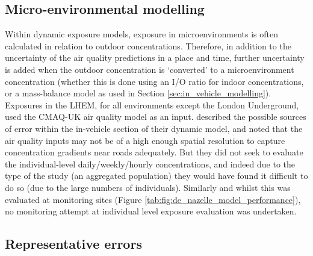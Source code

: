 \subsection{Micro-environmental modelling}
\label{microenvironmental_modelling}

Within dynamic exposure models, exposure in microenvironments is often calculated in relation to outdoor concentrations. Therefore, in addition to the uncertainty of the air quality predictions in a place and time, further uncertainty is added when the outdoor concentration is ‘converted’ to a microenvironment concentration (whether this is done using an I/O ratio for indoor concentrations, or a mass-balance model as used in Section \ref{sec:in_vehicle_modelling}). Exposures in the LHEM, for all environments except the London Underground, used the CMAQ-UK air quality model as an input. \cite{Dhondt2012} described the possible sources of error within the in-vehicle section of their dynamic model, and noted that the air quality inputs may not be of a high enough spatial resolution to capture concentration gradients near roads adequately. But they did not seek to evaluate the individual-level daily/weekly/hourly concentrations, and indeed due to the type of the study (an aggregated population) they would have found it difficult to do so (due to the large numbers of individuals). Similarly and whilst this was evaluated at monitoring sites (Figure \ref{tab:fig:de_nazelle_model_performance}), no monitoring attempt at individual level exposure evaluation was undertaken.

\subsection{Representative errors}
\label{representative_errors}

